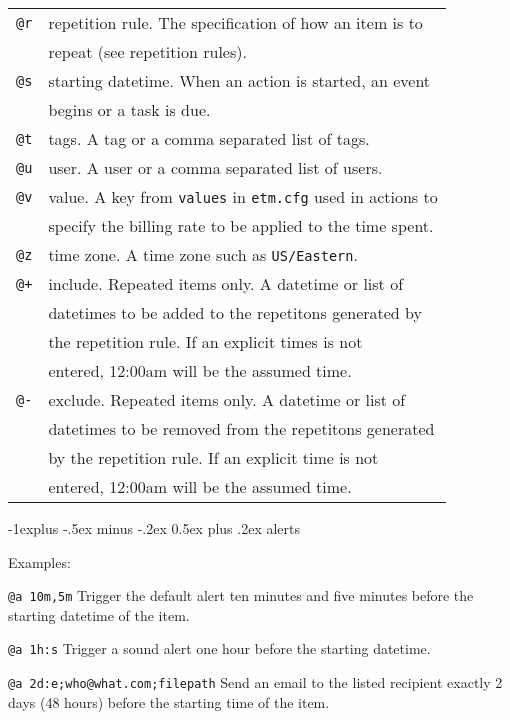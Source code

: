 \documentclass[10pt,landscape]{article}
\makeatletter
\renewcommand{\subsection}{\@startsection{subsection}{2}{0mm}%
                                {-1explus -.5ex minus -.2ex}%
                                {0.5ex plus .2ex}%
                                {\normalfont\normalsize\bfseries}}
\makeatother
\begin{document}
\begin{multicols}{3}
\begin{tabular}{@{}ll@{}}
\texttt{@r} & repetition rule. The specification of how an item is to \\
            & repeat (see repetition rules). \\
\texttt{@s} & starting datetime. When an action is started, an event \\
            & begins or a task is due. \\
\texttt{@t} & tags. A tag or a comma separated list of tags. \\
\texttt{@u} & user. A user or a comma separated list of users. \\
\texttt{@v} & value. A key from \texttt{values} in \texttt{etm.cfg} used in actions to \\
            & specify the billing rate to be applied to the time spent. \\
\texttt{@z} & time zone. A time zone such as \texttt{US/Eastern}. \\
\texttt{@+} & include. Repeated items only. A datetime or list of \\
            & datetimes to be added to the repetitons generated by \\
            & the repetition rule. If an explicit times is not \\
            & entered, 12:00am will be the assumed time.\\
\texttt{@-} & exclude. Repeated items only. A datetime or list of \\
            & datetimes to be removed from the repetitons generated \\
            & by the repetition rule. If an explicit time is not \\
            & entered, 12:00am will be the assumed time. \\

\end{tabular}


\subsection{alerts}

Examples:
\begin{compactdesc}
  \item[\texttt{@a 10m,5m}] Trigger the default alert ten minutes and five minutes before the starting datetime of the item.
  \item[\texttt{@a 1h:s}] Trigger a sound alert one hour before the starting datetime.
  \item[\texttt{@a 2d:e;who@what.com;filepath}] Send an email to the listed recipient exactly 2 days (48 hours) before the starting time of the item.
\end{compactdesc}


\end{multicols}
\end{document}
